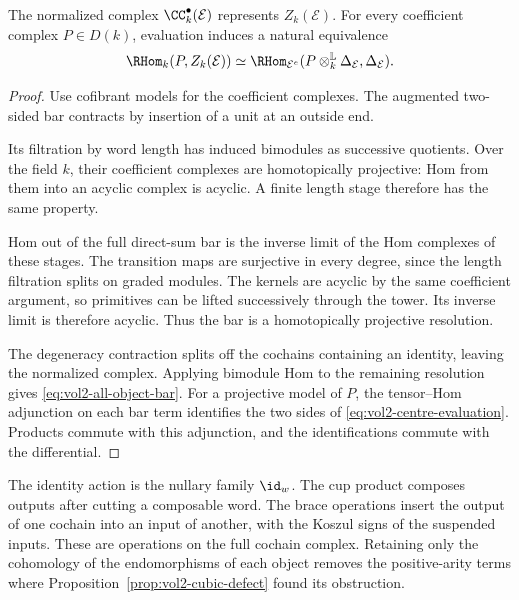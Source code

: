 \begin{proposition}
\label{prop:vol2-centre-evaluation}
The normalized complex $\CC_k^\bullet(\mathcal E)$ represents
$Z_k(\mathcal E)$. For every coefficient complex $P\in D(k)$,
evaluation induces a natural equivalence
\begin{equation}\label{eq:vol2-centre-evaluation}
 \RHom_k(P,Z_k(\mathcal E))
 \simeq
 \RHom_{\mathcal E^e}
 (P\otimes_k^{\mathbb L}\Delta_{\mathcal E},\Delta_{\mathcal E}).
\end{equation}
\end{proposition}

\begin{proof}
Use cofibrant models for the coefficient complexes. The augmented
two-sided bar contracts by insertion of a unit at an outside end.

Its filtration by word length has induced bimodules as successive
quotients. Over the field $k$, their coefficient complexes are
homotopically projective: Hom from them into an acyclic complex
is acyclic. A finite length stage therefore has the same property.

Hom out of the full direct-sum bar is the inverse limit of the
Hom complexes of these stages. The transition maps are surjective
in every degree, since the length filtration splits on graded
modules. The kernels are acyclic by the same coefficient argument,
so primitives can be lifted successively through the tower.
Its inverse limit is therefore acyclic. Thus the bar is a
homotopically projective resolution.

The degeneracy contraction splits off the cochains containing an
identity, leaving the normalized complex. Applying bimodule Hom
to the remaining resolution gives \eqref{eq:vol2-all-object-bar}.
For a projective model of $P$, the tensor--Hom adjunction on each
bar term identifies the two sides of
\eqref{eq:vol2-centre-evaluation}. Products commute with this
adjunction, and the identifications commute with the differential.
\end{proof}

The identity action is the nullary family $\id_w$.
The cup product composes outputs after cutting a composable word.
The brace operations insert the output of one cochain into an input
of another, with the Koszul signs of the suspended inputs.
These are operations on the full cochain complex. Retaining only
the cohomology of the endomorphisms of each object removes the
positive-arity terms where Proposition~\ref{prop:vol2-cubic-defect}
found its obstruction.

